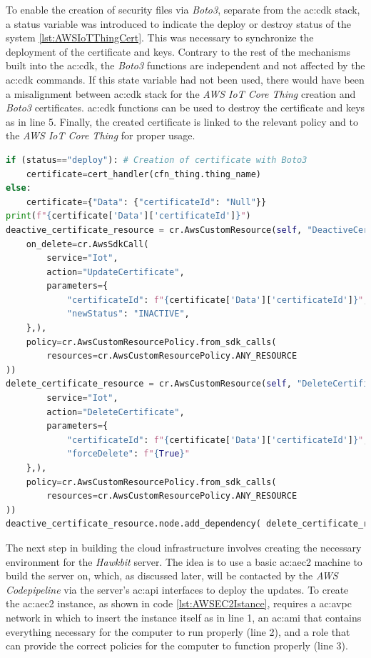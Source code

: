 To enable the creation of security files via \textit{Boto3}, separate from the \gls{ac:cdk} stack, a status variable was introduced to indicate the deploy or destroy status of the system \ref{lst:AWSIoTThingCert}. This was necessary to synchronize the deployment of the certificate and keys. Contrary to the rest of the mechanisms built into the \gls{ac:cdk}, the \textit{Boto3} functions are independent and not affected by the \gls{ac:cdk} commands. If this state variable had not been used, there would have been a misalignment between \gls{ac:cdk} stack for the \textit{AWS IoT Core Thing} creation and \textit{Boto3} certificates. \gls{ac:cdk} functions can be used to destroy the certificate and keys as in line 5. Finally, the created certificate is linked to the relevant policy and to the \textit{AWS IoT Core Thing} for proper usage.
\begin{lstlisting}[language=Python, caption={Code for the creation and destruction of \textit{AWS IoT Core Thing} certificates and keys from the \textit{CDK} stack}, label=lst:AWSIoTThingCert]
if (status=="deploy"): # Creation of certificate with Boto3
    certificate=cert_handler(cfn_thing.thing_name)
else:
    certificate={"Data": {"certificateId": "Null"}}
print(f"{certificate['Data']['certificateId']}")
deactive_certificate_resource = cr.AwsCustomResource(self, "DeactiveCertificateResource",
    on_delete=cr.AwsSdkCall(
        service="Iot",
        action="UpdateCertificate",
        parameters={
            "certificateId": f"{certificate['Data']['certificateId']}",
            "newStatus": "INACTIVE",
    },),
    policy=cr.AwsCustomResourcePolicy.from_sdk_calls(
        resources=cr.AwsCustomResourcePolicy.ANY_RESOURCE
))
delete_certificate_resource = cr.AwsCustomResource(self, "DeleteCertificateResource", # Destruction of certificates
        service="Iot",
        action="DeleteCertificate",
        parameters={
            "certificateId": f"{certificate['Data']['certificateId']}",
            "forceDelete": f"{True}"
    },),
    policy=cr.AwsCustomResourcePolicy.from_sdk_calls(
        resources=cr.AwsCustomResourcePolicy.ANY_RESOURCE
))
deactive_certificate_resource.node.add_dependency( delete_certificate_resource )
\end{lstlisting}

The next step in building the cloud infrastructure involves creating the necessary environment for the \textit{Hawkbit} server. The idea is to use a basic \gls{ac:aec2} machine to build the server on, which, as discussed later, will be contacted by the \textit{AWS Codepipeline} via the server's \gls{ac:api} interfaces to deploy the updates. To create the \gls{ac:aec2} instance, as shown in code \ref{lst:AWSEC2Istance}, requires a \gls{ac:avpc} network in which to insert the instance itself as in line 1, an \gls{ac:ami} that contains everything necessary for the computer to run properly (line 2), and a role that can provide the correct policies for the computer to function properly (line 3).

